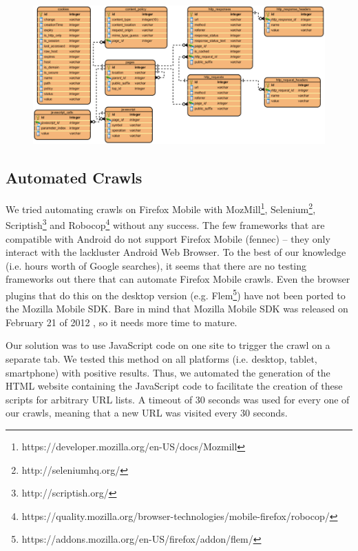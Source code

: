 \documentclass{acm_proc_article-sp}
\begin{document}
\begin{figure}[ht] 
\centering \includegraphics[scale=0.70]{diagrams/db_diagram.png}
\label{fig:db_schema}
\end{figure}

\subsection{Automated Crawls}

We tried automating crawls on Firefox Mobile with MozMill\footnote{https://developer.mozilla.org/en-US/docs/Mozmill}, Selenium\footnote{http://seleniumhq.org/}, Scriptish\footnote{http://scriptish.org/} and Robocop\footnote{https://quality.mozilla.org/browser-technologies/mobile-firefox/robocop/} without any success. The few frameworks that are compatible with Android do not support Firefox Mobile (fennec) -- they only interact with the lackluster Android Web Browser. To the best of our knowledge (i.e. hours worth of Google searches), it seems that there are no testing frameworks out there that can automate Firefox Mobile crawls. Even the browser plugins that do this on the desktop version (e.g. Flem\footnote{https://addons.mozilla.org/en-US/firefox/addon/flem/}) have not been ported to the Mozilla Mobile SDK. Bare in mind that Mozilla Mobile SDK was released on February 21 of 2012 \cite{announcing_sdk}, so it needs more time to mature.

Our solution was to use JavaScript code on one site to trigger the crawl on a separate tab. We tested this method on all platforms (i.e. desktop, tablet, smartphone) with positive results. Thus, we automated the generation of the HTML website containing the JavaScript code to facilitate the creation of these scripts for arbitrary URL lists. A timeout of 30 seconds was used for every one of our crawls, meaning that a new URL was visited every 30 seconds.
\end{document}
